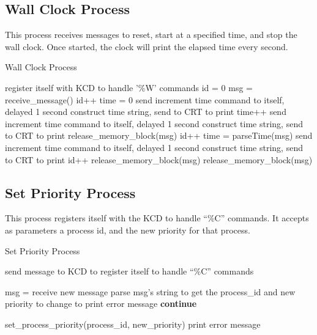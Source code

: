 \documentclass[12pt]{report}
\begin{document}
\subsection{Wall Clock Process}

This process receives messages to reset, start at a specified time, and stop the wall clock. Once started, the clock will print the elapsed time every second.

\begin{algorithm}[H]
	\caption{Wall Clock Process}
	\begin{algorithmic}[1]
	    \State register itself with KCD to handle '\%W' commands
	    \State id = 0
	    \texttt{}
	      \State msg = receive\_message()
	        \State id++
	        \State time = 0
	        \State send increment time command to itself, delayed 1 second
	        \State construct time string, send to CRT to print
	          \State time++
	          \State send increment time command to itself, delayed 1 second
	          \State construct time string, send to CRT to print
	        \Else
	          \State release\_memory\_block(msg)
	        \EndIf
	        \State id++
	        \State time = parseTime(msg)
	        \State send increment time command to itself, delayed 1 second
	        \State construct time string, send to CRT to print
	        \State id++
	        \State release\_memory\_block(msg)
	      \Else
	        \State release\_memory\_block(msg)
	      \EndIf
	    \EndWhile
	  \EndFunction
	\end{algorithmic}
\end{algorithm}

\subsection{Set Priority Process}

This process registers itself with the KCD to handle ``\%C'' commands. It accepts as parameters a process id, and the new priority for that process.

\begin{algorithm}[H]
	\caption{Set Priority Process}
	\begin{algorithmic}[1]
	  	\State send message to KCD to register itself to handle ``\%C'' commands

	  		\State msg = receive new message
	  		\State parse msg's string to get the process_id and new priority to change to
	  			\State print error message
	  			\State \textbf{continue}
	  		\EndIf

	  		\State set_process_priority(process_id, new_priority)
	  			\State print error message
	  		\EndIf
	  	\EndWhile
	  \EndFunction
	\end{algorithmic}
\end{algorithm}
\end{document}
